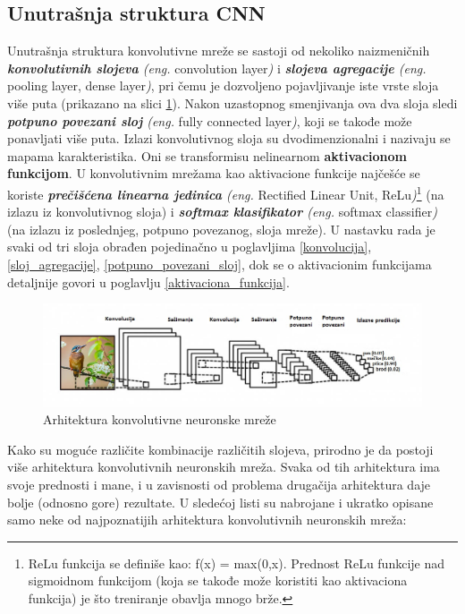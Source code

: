 \documentclass[a4paper]{article}
\begin{document}
\subsection{Unutrašnja struktura CNN}
\label{struktura_cnn}
Unutrašnja struktura konvolutivne mreže se sastoji od nekoliko naizmeničnih \textit{\textbf{konvolutivnih slojeva} (eng.} convolution layer\textit{)} i \textit{\textbf{slojeva agregacije} (eng.} pooling layer, dense layer\textit{)}, pri čemu je dozvoljeno pojavljivanje iste vrste sloja više puta (prikazano na slici \ref{fig:cnn_layers}). Nakon uzastopnog smenjivanja ova dva sloja sledi \textit{\textbf{potpuno povezani sloj} (eng.} fully connected layer\textit{)}, koji se takođe može ponavljati više puta. Izlazi konvolutivnog sloja su dvodimenzionalni i nazivaju se mapama karakteristika. Oni se transformisu nelinearnom \textbf{aktivacionom funkcijom}. U konvolutivnim mrežama kao aktivacione funkcije najčešće se koriste \textit{\textbf{prečišćena linearna jedinica} (eng.} Rectified Linear Unit, ReLu\textit{)}\footnote{ReLu funkcija se definiše kao: f(x) = max(0,x). Prednost ReLu funkcije nad sigmoidnom funkcijom (koja se takođe može koristiti kao aktivaciona funkcija) je što treniranje obavlja mnogo brže.} (na izlazu iz konvolutivnog sloja) i \textit{\textbf{softmax klasifikator} (eng.} softmax classifier\textit{)} (na izlazu iz poslednjeg, potpuno povezanog, sloja mreže). U nastavku rada je svaki od tri sloja obrađen pojedinačno u poglavljima \ref{konvolucija}, \ref{sloj_agregacije}, \ref{potpuno_povezani_sloj}, dok se o aktivacionim funkcijama detaljnije govori u poglavlju \ref{aktivaciona_funkcija}.


\begin{figure}[h!]
\begin{center}
\includegraphics[scale=0.62]{cnn_layers.jpg}
\end{center}
\caption{Arhitektura konvolutivne neuronske mreže}
\label{fig:cnn_layers}
\end{figure}

Kako su moguće različite kombinacije različitih slojeva, prirodno je da postoji više arhitektura konvolutivnih neuronskih mreža. Svaka od tih arhitektura ima svoje prednosti i mane, i u zavisnosti od problema drugačija arhitektura daje bolje (odnosno gore) rezultate. U sledećoj listi su nabrojane i ukratko opisane samo neke od najpoznatijih arhitektura konvolutivnih neuronskih mreža:
\end{document}
